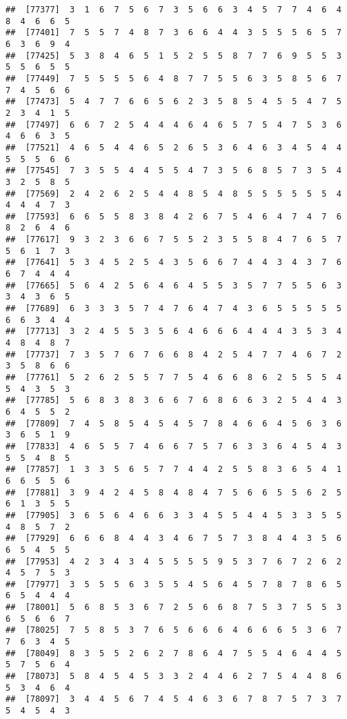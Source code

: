 \documentclass[
]{book}
\begin{document}
\begin{verbatim}
##  [77377]  3  1  6  7  5  6  7  3  5  6  6  3  4  5  7  7  4  6  4  8  4  6  6  5
##  [77401]  7  5  5  7  4  8  7  3  6  6  4  4  3  5  5  5  6  5  7  6  3  6  9  4
##  [77425]  5  3  8  4  6  5  1  5  2  5  5  8  7  7  6  9  5  5  3  5  5  6  5  5
##  [77449]  7  5  5  5  5  6  4  8  7  7  5  5  6  3  5  8  5  6  7  7  4  5  6  6
##  [77473]  5  4  7  7  6  6  5  6  2  3  5  8  5  4  5  5  4  7  5  2  3  4  1  5
##  [77497]  6  6  7  2  5  4  4  4  6  4  6  5  7  5  4  7  5  3  6  4  6  6  3  5
##  [77521]  4  6  5  4  4  6  5  2  6  5  3  6  4  6  3  4  5  4  4  5  5  5  6  6
##  [77545]  7  3  5  5  4  4  5  5  4  7  3  5  6  8  5  7  3  5  4  3  2  5  8  5
##  [77569]  2  4  2  6  2  5  4  4  8  5  4  8  5  5  5  5  5  5  4  4  4  4  7  3
##  [77593]  6  6  5  5  8  3  8  4  2  6  7  5  4  6  4  7  4  7  6  8  2  6  4  6
##  [77617]  9  3  2  3  6  6  7  5  5  2  3  5  5  8  4  7  6  5  7  5  6  1  7  3
##  [77641]  5  3  4  5  2  5  4  3  5  6  6  7  4  4  3  4  3  7  6  6  7  4  4  4
##  [77665]  5  6  4  2  5  6  4  6  4  5  5  3  5  7  7  5  5  6  3  3  4  3  6  5
##  [77689]  6  3  3  3  5  7  4  7  6  4  7  4  3  6  5  5  5  5  5  6  6  3  4  4
##  [77713]  3  2  4  5  5  3  5  6  4  6  6  6  4  4  4  3  5  3  4  4  8  4  8  7
##  [77737]  7  3  5  7  6  7  6  6  8  4  2  5  4  7  7  4  6  7  2  3  5  8  6  6
##  [77761]  5  2  6  2  5  5  7  7  5  4  6  6  8  6  2  5  5  5  4  5  4  3  5  3
##  [77785]  5  6  8  3  8  3  6  6  7  6  8  6  6  3  2  5  4  4  3  6  4  5  5  2
##  [77809]  7  4  5  8  5  4  5  4  5  7  8  4  6  6  4  5  6  3  6  3  6  5  1  9
##  [77833]  4  6  5  5  7  4  6  6  7  5  7  6  3  3  6  4  5  4  3  5  5  4  8  5
##  [77857]  1  3  3  5  6  5  7  7  4  4  2  5  5  8  3  6  5  4  1  6  6  5  5  6
##  [77881]  3  9  4  2  4  5  8  4  8  4  7  5  6  6  5  5  6  2  5  6  1  3  5  5
##  [77905]  3  6  5  6  4  6  6  3  3  4  5  5  4  4  5  3  3  5  5  4  8  5  7  2
##  [77929]  6  6  6  8  4  4  3  4  6  7  5  7  3  8  4  4  3  5  6  6  5  4  5  5
##  [77953]  4  2  3  4  3  4  5  5  5  5  9  5  3  7  6  7  2  6  2  4  5  7  5  3
##  [77977]  3  5  5  5  6  3  5  5  4  5  6  4  5  7  8  7  8  6  5  6  5  4  4  4
##  [78001]  5  6  8  5  3  6  7  2  5  6  6  8  7  5  3  7  5  5  3  6  5  6  6  7
##  [78025]  7  5  8  5  3  7  6  5  6  6  6  4  6  6  6  5  3  6  7  7  6  3  4  5
##  [78049]  8  3  5  5  2  6  2  7  8  6  4  7  5  5  4  6  4  4  5  5  7  5  6  4
##  [78073]  5  8  4  5  4  5  3  3  2  4  4  6  2  7  5  4  4  8  6  5  3  4  6  4
##  [78097]  3  4  4  5  6  7  4  5  4  6  3  6  7  8  7  5  7  3  7  5  4  5  4  3

\end{verbatim}
\end{document}
